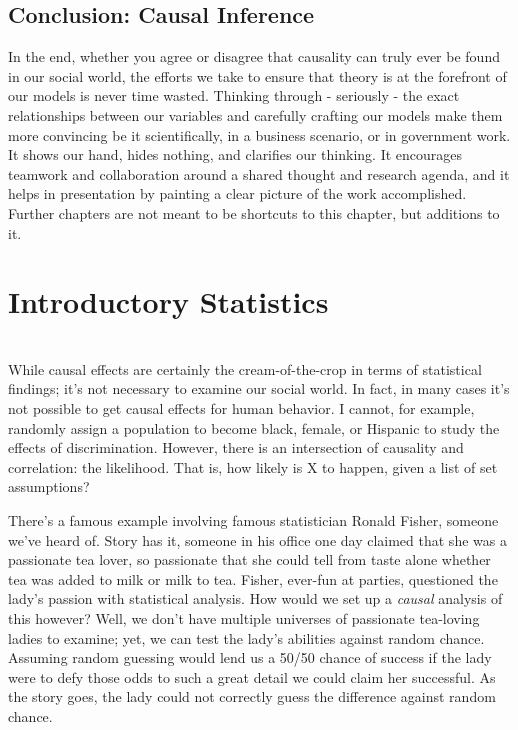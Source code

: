 \documentclass[12pt]{article}\usepackage[]{graphicx}\usepackage[]{color}
\begin{document}
\begin{flushleft}
\subsection{Conclusion: Causal Inference}

In the end, whether you agree or disagree that causality can truly ever be found in our social world, the efforts we take to ensure that theory is at the forefront of our models is never time wasted. Thinking through - seriously - the exact relationships between our variables and carefully crafting our models make them more convincing be it scientifically, in a business scenario, or in government work. It shows our hand, hides nothing, and clarifies our thinking. It encourages teamwork and collaboration around a shared thought and research agenda, and it helps in presentation by painting a clear picture of the work accomplished. Further chapters are not meant to be shortcuts to this chapter, but additions to it.

\clearpage
\section{Introductory Statistics}
\hfill \\

While causal effects are certainly the cream-of-the-crop in terms of statistical findings; it's not necessary to examine our social world. In fact, in many cases it's not possible to get causal effects for human behavior. I cannot, for example, randomly assign a population to become black, female, or Hispanic to study the effects of discrimination. However, there is an intersection of causality and correlation: the likelihood. That is, how likely is X to happen, given a list of set assumptions?

There's a famous example involving famous statistician Ronald Fisher, someone we've heard of. Story has it, someone in his office one day claimed that she was a passionate tea lover, so passionate that she could tell from taste alone whether tea was added to milk or milk to tea. Fisher, ever-fun at parties, questioned the lady's passion with statistical analysis. How would we set up a \textit{causal} analysis of this however? Well, we don't have multiple universes of passionate tea-loving ladies to examine; yet, we can test the lady's abilities against random chance. Assuming random guessing would lend us a 50/50 chance of success if the lady were to defy those odds to such a great detail we could claim her successful. As the story goes, the lady could not correctly guess the difference against random chance.


\end{flushleft}
\end{document}
